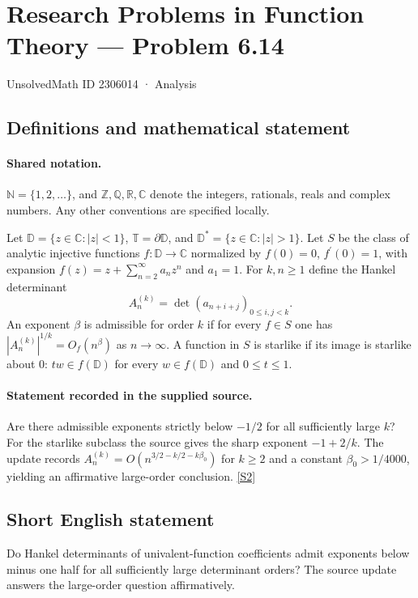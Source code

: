 \documentclass[11pt]{book}
\newcommand{\sref}[2]{\hyperlink{source:#1:#2}{[S#2]}}
\begin{document}
\setcounter{section}{2306013}
\section{Research Problems in Function Theory — Problem 6.14}\label{2306014}
{\small\sffamily UnsolvedMath ID 2306014 · Analysis}
\subsection{Definitions and mathematical statement}

\paragraph{Shared notation.}$\mathbb N=\{1,2,\ldots\}$, and $\mathbb Z,\mathbb Q,\mathbb R,\mathbb C$ denote the integers, rationals, reals and complex numbers. Any other conventions are specified locally.


Let $\mathbb D=\{z\in\mathbb C:|z|<1\}$, $\mathbb T=\partial\mathbb D$, and $\mathbb D^*=\{z\in\mathbb C:|z|>1\}$. Let $S$ be the class of analytic injective functions $f:\mathbb D\to\mathbb C$ normalized by $f(0)=0$, $f^{\prime}(0)=1$, with expansion $f(z)=z+\sum_{n=2}^{\infty}a_nz^n$ and $a_1=1$. For $k,n\ge1$ define the Hankel determinant \[A_n^{(k)}=\det(a_{n+i+j})_{0\le i,j<k}.\] An exponent $\beta$ is admissible for order $k$ if for every $f\in S$ one has $|A_n^{(k)}|^{1/k}=O_f(n^{\beta})$ as $n\to\infty$. A function in $S$ is starlike if its image is starlike about $0$: $tw\in f(\mathbb D)$ for every $w\in f(\mathbb D)$ and $0\le t\le1$.
\paragraph{Statement recorded in the supplied source.}
Are there admissible exponents strictly below $-1/2$ for all sufficiently large $k$? For the starlike subclass the source gives the sharp exponent $-1+2/k$. The update records $A_n^{(k)}=O(n^{3/2-k/2-k\beta_0})$ for $k\ge2$ and a constant $\beta_0>1/4000$, yielding an affirmative large-order conclusion. \sref{2306014}{2}
\subsection{Short English statement}
Do Hankel determinants of univalent-function coefficients admit exponents below minus one half for all sufficiently large determinant orders? The source update answers the large-order question affirmatively.
\end{document}
